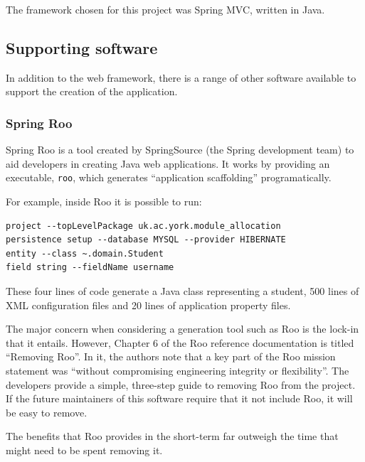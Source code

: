 \documentclass[]{scrartcl}
\begin{document}

The framework chosen for this project was Spring MVC, written in Java.


\subsection{Supporting software}

In addition to the web framework, there is a range of other software available
to support the creation of the application.

\subsubsection{Spring Roo}

Spring Roo is a tool created by SpringSource (the Spring development team) to
aid developers in creating Java web applications. It works by providing an
executable, \texttt{roo}, which generates ``application scaffolding''
programatically.

For example, inside Roo it is possible to run:

\begin{lstlisting}
project --topLevelPackage uk.ac.york.module_allocation
persistence setup --database MYSQL --provider HIBERNATE
entity --class ~.domain.Student
field string --fieldName username
\end{lstlisting}

These four lines of code generate a Java class representing a student, 500
lines of XML configuration files and 20 lines of application property files.

The major concern when considering a generation tool such as Roo is the
lock-in that it entails. However, Chapter 6 of the Roo reference documentation
\cite{RooReferenceDocs2011} is titled ``Removing Roo''. In it, the authors
note that a key part of the Roo mission statement was ``without compromising
engineering integrity or flexibility''. The developers provide a simple,
three-step guide to removing Roo from the project. If the future maintainers
of this software require that it not include Roo, it will be easy to remove.

The benefits that Roo provides in the short-term far outweigh the time that
might need to be spent removing it.
\end{document}
